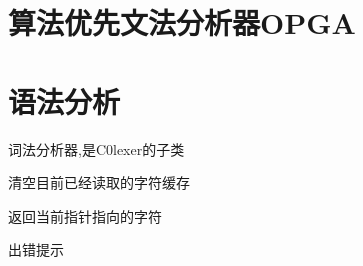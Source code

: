 \documentclass[letterpaper,10pt,english]{sphinxmanual}
\begin{document}
\section{算法优先文法分析器OPGA}
\label{\detokenize{OPG/OPGA::doc}}\label{\detokenize{OPG/OPGA:opga}}

\section{语法分析}
\label{\detokenize{grammar_analysis/gramma::doc}}\label{\detokenize{grammar_analysis/gramma:id1}}

\begin{fulllineitems}
\label{\detokenize{grammar_analysis/gramma:grammar_analysis.utils.special_lexer}}
词法分析器,是C0lexer的子类

\begin{fulllineitems}
\label{\detokenize{grammar_analysis/gramma:grammar_analysis.utils.special_lexer.clearToken}}
清空目前已经读取的字符缓存

\end{fulllineitems}


\begin{fulllineitems}
\label{\detokenize{grammar_analysis/gramma:grammar_analysis.utils.special_lexer.curChar}}
返回当前指针指向的字符

\end{fulllineitems}


\begin{fulllineitems}
\label{\detokenize{grammar_analysis/gramma:grammar_analysis.utils.special_lexer.error}}
出错提示

\end{fulllineitems}



\end{fulllineitems}
\end{document}
